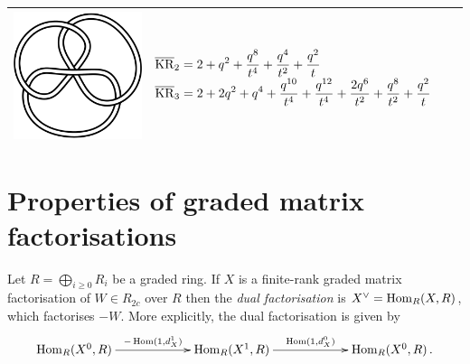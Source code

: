 \documentclass{compositio}
\theoremstyle{definition}
\numberwithin{equation}{section}
\def\Hom{\operatorname{Hom}}
\begin{document}
{\begin{longtable}{p{}|p{}}
\includegraphics[scale=0.07,angle=0]{link6_3_3.pdf} 
& 
\newline
$
\displaystyle{%
\overline{\KR}_{2} = 2+q^2+\frac{q^8}{t^4}+\frac{q^4}{t^2}+\frac{q^2}{t}
}
$
\newline 
$
\displaystyle{%
\overline{\KR}_{3} = 2+2 q^2+q^4+\frac{q^{10}}{t^4}+\frac{q^{12}}{t^4}+\frac{2 q^6}{t^2}+\frac{q^8}{t^2}+\frac{q^2}{t}
}
$
\newline
\\
\hline
\end{longtable}
}


\newpage
\appendix

\section{Properties of graded matrix factorisations}\label{appendix:graded_mfs}

Let $R = \bigoplus_{i \ge 0} R_i$ be a graded ring. If $X$ is a finite-rank graded matrix factorisation of $W \in R_{2c}$ over $R$ then the \emph{dual factorisation} is $X\mdual = \Hom_R(X,R)$, which factorises $-W$. More explicitly, the dual factorisation is given by
\[
\xymatrix@C+3pc{
\Hom_R(X^0, R) \ar[r]^-{-\Hom(1, d^1_X)} & \Hom_R(X^1,R) \ar[r]^-{\Hom(1,d^0_X)} & \Hom_R(X^0, R) \, .
}
\]
\end{document}

